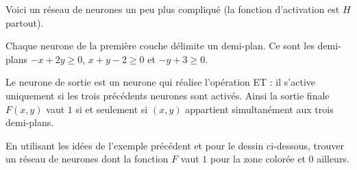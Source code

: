 \begin{exemple}{}{}
	Voici un réseau de neurones un peu plus compliqué (la fonction d'activation est $H$ partout). 
	
	Chaque neurone de la première couche délimite un demi-plan. Ce sont les demi-plans $-x+2y\ge0$, $x+y-2\ge0$ et $-y+3\ge0$.
	
	Le neurone de sortie est un neurone qui réalise l'opération \og{}ET\fg{} : il s'active uniquement si les trois précédents neurones sont activés.
	Ainsi la sortie finale $F(x,y)$ vaut $1$ si et seulement si $(x,y)$ appartient simultanément aux trois demi-plans.
	
	
\end{exemple}

\begin{exemple}{}{}
	En utilisant les idées de l'exemple précédent et pour le dessin ci-dessous, trouver un réseau de neurones dont la fonction $F$ vaut $1$ pour la zone colorée et $0$ ailleurs.
	
	
	
\end{exemple}


